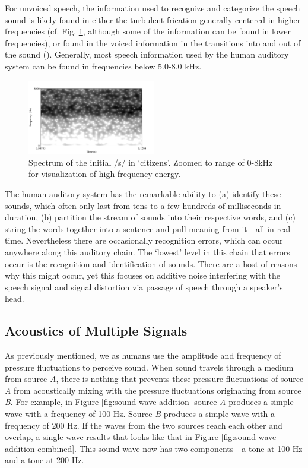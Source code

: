 For unvoiced speech, the information used to recognize and categorize the speech sound is likely found in either the turbulent frication generally centered in higher frequencies (cf. Fig. \ref{fig:spctgrm_s}, although some of the information can be found in lower frequencies), or found in the voiced information in the transitions into and out of the sound (\cite{halle:57,lindblom:63,stevens:78,willi:17}).  Generally, most speech information used by the human auditory system can be found in frequencies below 5.0-8.0 kHz.
%
\begin{figure}
\centering
  \includegraphics[width=0.5\textwidth]{figure/spctgrm_s.png}
  \caption{Spectrum of the initial /s/ in `citizens'. Zoomed to range of 0-8kHz for visualization of high frequency energy.}
  \label{fig:spctgrm_s}
\end{figure}

The human auditory system has the remarkable ability to (a) identify these sounds, which often only last from tens to a few hundreds of milliseconds in duration, (b) partition the stream of sounds into their respective words, and (c) string the words together into a sentence and pull meaning from it - all in real time.  Nevertheless there are occasionally recognition errors, which can occur anywhere along this auditory chain.  The `lowest' level in this chain that errors occur is the recognition and identification of sounds.  There are a host of reasons why this might occur, yet this focuses on additive noise interfering with the speech signal and signal distortion via passage of speech through a speaker's head.

\subsection{Acoustics of Multiple Signals}

As previously mentioned, we as humans use the amplitude and frequency of pressure fluctuations to perceive sound. When sound travels through a medium from source \textit{A}, there is nothing that prevents these pressure fluctuations of source \textit{A} from acoustically mixing with the pressure fluctuations originating from source \textit{B}.  For example, in Figure \ref{fig:sound-wave-addition} source \textit{A} produces a simple wave with a frequency of 100 Hz.  Source \textit{B} produces a simple wave with a frequency of 200 Hz.  If the waves from the two sources reach each other and overlap, a single wave results that looks like that in Figure \ref{fig:sound-wave-addition-combined}.  This sound wave now has two components - a tone at 100 Hz and a tone at 200 Hz.

